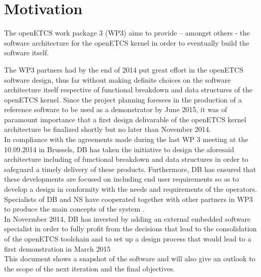 %
\section{Motivation}
The openETCS work package 3 (WP3) aims to provide – amongst others - the software architecture for the openETCS kernel in order to eventually build the software itself. 

The WP3  partners had by the end of 2014 put great effort in the openETCS software design, thus far without making definite choices on the software architecture itself respective of functional breakdown and data structures of the openETCS kernel. Since the project planning foresees in the production of a reference software to be used as a demonstrator by June 2015, it was of paramount importance that a first design delivarable of the openETCS kernel architecture be finalized shortly but no later than November 2014.\\

In compliance with the agreements made during the last WP 3 meeting at the 10.09.2014 in Brussels, DB has taken the initiative to design the aforesaid architecture including of functional breakdown and data structures in order to safeguard a timely delivery of these products. Furthermore, DB has ensured that these developments are focused on including end user requirements so as to develop a design in conformity with the needs and requirements of the operators. Specialists of DB and NS have cooperated together with other partners in WP3 to produce the main concepts of the system .\\

In Novermber 2014, DB has invested by adding an external embedded software specialist in order to fully profit from the decisions that lead to the consolidation of the openETCS toolchain and to set up a design process that would lead to a first demonstration in March 2015\\

This document shows a snapshot of the software and will also give an outlook to the scope of the next iteration and the final objectives.\\


